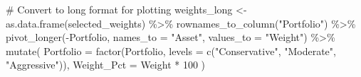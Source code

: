 \documentclass[
  10pt,
  a4paper,
]{article}
\newenvironment{Shaded}{\begin{snugshade}}{\end{snugshade}}
\newcommand{\AttributeTok}[1]{\textcolor[rgb]{0.40,0.45,0.13}{#1}}
\newcommand{\CommentTok}[1]{\textcolor[rgb]{0.37,0.37,0.37}{#1}}
\newcommand{\DecValTok}[1]{\textcolor[rgb]{0.68,0.00,0.00}{#1}}
\newcommand{\FunctionTok}[1]{\textcolor[rgb]{0.28,0.35,0.67}{#1}}
\newcommand{\NormalTok}[1]{\textcolor[rgb]{0.00,0.23,0.31}{#1}}
\newcommand{\OtherTok}[1]{\textcolor[rgb]{0.00,0.23,0.31}{#1}}
\newcommand{\SpecialCharTok}[1]{\textcolor[rgb]{0.37,0.37,0.37}{#1}}
\newcommand{\StringTok}[1]{\textcolor[rgb]{0.13,0.47,0.30}{#1}}
\begin{document}
\begin{Shaded}
\begin{Highlighting}[]
\CommentTok{\# Convert to long format for plotting}
\NormalTok{weights\_long }\OtherTok{\textless{}{-}} \FunctionTok{as.data.frame}\NormalTok{(selected\_weights) }\SpecialCharTok{\%\textgreater{}\%}
  \FunctionTok{rownames\_to\_column}\NormalTok{(}\StringTok{"Portfolio"}\NormalTok{) }\SpecialCharTok{\%\textgreater{}\%}
  \FunctionTok{pivot\_longer}\NormalTok{(}\SpecialCharTok{{-}}\NormalTok{Portfolio, }\AttributeTok{names\_to =} \StringTok{"Asset"}\NormalTok{, }\AttributeTok{values\_to =} \StringTok{"Weight"}\NormalTok{) }\SpecialCharTok{\%\textgreater{}\%}
  \FunctionTok{mutate}\NormalTok{(}
    \AttributeTok{Portfolio =} \FunctionTok{factor}\NormalTok{(Portfolio, }\AttributeTok{levels =} \FunctionTok{c}\NormalTok{(}\StringTok{"Conservative"}\NormalTok{, }\StringTok{"Moderate"}\NormalTok{, }\StringTok{"Aggressive"}\NormalTok{)),}
    \AttributeTok{Weight\_Pct =}\NormalTok{ Weight }\SpecialCharTok{*} \DecValTok{100}
\NormalTok{  )}


\end{Highlighting}
\end{Shaded}
\end{document}
